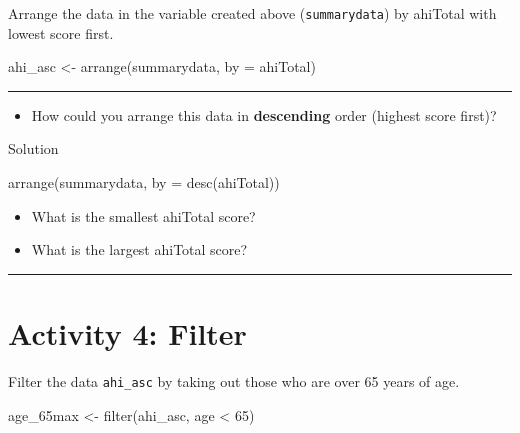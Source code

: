 \documentclass[
  oneside]{book}
\newenvironment{Shaded}{\begin{snugshade}}{\end{snugshade}}
\newcommand{\AttributeTok}[1]{\textcolor[rgb]{0.77,0.63,0.00}{#1}}
\newcommand{\DecValTok}[1]{\textcolor[rgb]{0.00,0.00,0.81}{#1}}
\newcommand{\FunctionTok}[1]{\textcolor[rgb]{0.00,0.00,0.00}{#1}}
\newcommand{\NormalTok}[1]{#1}
\newcommand{\OtherTok}[1]{\textcolor[rgb]{0.56,0.35,0.01}{#1}}
\newcommand{\SpecialCharTok}[1]{\textcolor[rgb]{0.00,0.00,0.00}{#1}}
\providecommand{\tightlist}{%
  \setlength{\itemsep}{0pt}\setlength{\parskip}{0pt}}
\begin{document}
Arrange the data in the variable created above (\texttt{summarydata}) by ahiTotal with lowest score first.

\begin{Shaded}
\begin{Highlighting}[]
\NormalTok{ahi\_asc }\OtherTok{\textless{}{-}} \FunctionTok{arrange}\NormalTok{(summarydata, }\AttributeTok{by =}\NormalTok{ ahiTotal)}
\end{Highlighting}
\end{Shaded}

\begin{center}\rule{0.5\linewidth}{0.5pt}\end{center}

\begin{itemize}
\tightlist
\item
  How could you arrange this data in \textbf{descending} order (highest score first)?
\end{itemize}

Solution

\begin{Shaded}
\begin{Highlighting}[]
\FunctionTok{arrange}\NormalTok{(summarydata, }\AttributeTok{by =} \FunctionTok{desc}\NormalTok{(ahiTotal))}
\end{Highlighting}
\end{Shaded}

\begin{itemize}
\item
  What is the smallest ahiTotal score?
\item
  What is the largest ahiTotal score?
\end{itemize}

\begin{center}\rule{0.5\linewidth}{0.5pt}\end{center}

\hypertarget{activity-4-filter}{%
\section{Activity 4: Filter}\label{activity-4-filter}}

Filter the data \texttt{ahi\_asc} by taking out those who are over 65 years of age.

\begin{Shaded}
\begin{Highlighting}[]
\NormalTok{age\_65max }\OtherTok{\textless{}{-}} \FunctionTok{filter}\NormalTok{(ahi\_asc, age }\SpecialCharTok{\textless{}} \DecValTok{65}\NormalTok{)}
\end{Highlighting}
\end{Shaded}
\end{document}
